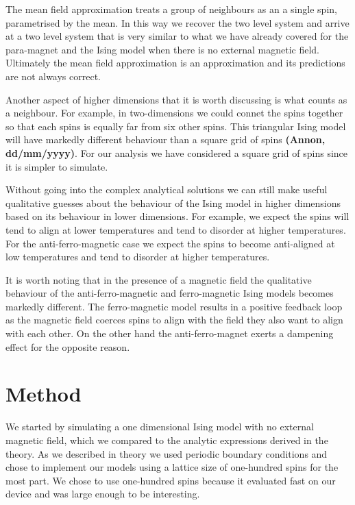 \documentclass[a4paper]{article}
\def\citation{{\bfseries (Annon, dd/mm/yyyy)}}
\begin{document}
\begin{multicols}{2}
        The mean field approximation treats a group of neighbours as an %
        a single spin, parametrised by the mean. In this way we recover %
        the two level system and arrive at a two level system that is %
        very similar to what we have already covered for the para-magnet %
        and the Ising model when there is no external magnetic field. %
        Ultimately the mean field approximation is an approximation and %
        its predictions are not always correct. 


        Another aspect of higher dimensions that it is worth discussing %
        is what counts as a neighbour. For example, in two-dimensions %
        we could connet the spins together so that each spins is equally %
        far from six other spins. This triangular Ising model will have %
        markedly different behaviour than a square grid of spins \citation. %
        For our analysis we have considered a square grid of spins since %
        it is simpler to simulate. 


        Without going into the complex analytical solutions we can still %
        make useful qualitative guesses about the behaviour of the Ising %
        model in higher dimensions based on its behaviour in lower %
        dimensions. For example, we expect the spins will tend to align %
        at lower temperatures and tend to disorder at higher temperatures. %
        For the anti-ferro-magnetic case we expect the spins to become %
        anti-aligned at low temperatures and tend to disorder at higher %
        temperatures.


        It is worth noting that in the presence of a magnetic field the %
        qualitative behaviour of the anti-ferro-magnetic and ferro-magnetic %
        Ising models becomes markedly different. The ferro-magnetic model %
        results in a positive feedback loop as the magnetic field coerces %
        spins to align with the field they also want to align with each other.
        On the other hand the anti-ferro-magnet exerts a dampening effect %
        for the opposite reason. 


    \section*{Method}
        We started by simulating a one dimensional Ising model with no %
        external magnetic field, which we compared to the analytic %
        expressions derived in the theory. As we described in theory %
        we used periodic boundary conditions and chose to implement %
        our models using a lattice size of one-hundred spins for the %
        most part. We chose to use one-hundred spins because it evaluated %
        fast on our device and was large enough to be interesting. 



\end{multicols}
\end{document}
